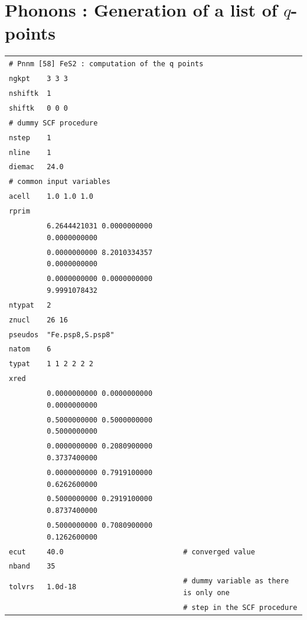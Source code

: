 \documentclass[11pt,a4paper]{article}
\begin{document}
\section{Phonons : Generation of a list of $q$-points}
\label{Abi9}
\begin{center}
\begin{tabular}{lll}
\multicolumn{3}{l}{\texttt{\# Pnnm [58] FeS2 : computation of the q points}}\\
\texttt{ngkpt} & \texttt{3 3 3} & \\
\texttt{nshiftk} & \texttt{1} & \\
\texttt{shiftk} & \texttt{0 0 0} & \\
\multicolumn{3}{l}{\texttt{\# dummy SCF procedure}}\\
\texttt{nstep} & \texttt{1} & \\
\texttt{nline} & \texttt{1} & \\
\texttt{diemac} &\texttt{24.0}\\
\multicolumn{3}{l}{\texttt{\# common input variables}}\\
\texttt{acell} & \texttt{1.0 1.0 1.0} & \\
\texttt{rprim}&&\\
&\texttt{6.2644421031    0.0000000000    0.0000000000}&\\
&\texttt{0.0000000000    8.2010334357    0.0000000000}&\\
&\texttt{0.0000000000    0.0000000000    9.9991078432}&\\
\texttt{ntypat} & \texttt{2} & \\
\texttt{znucl} & \texttt{26 16} & \\
\texttt{pseudos}&\texttt{"Fe.psp8,S.psp8"}&\\
\texttt{natom}&\texttt{6}&\\
\texttt{typat}&\texttt{1 1 2 2 2 2}&\\
\texttt{xred} &&\\
&\texttt{0.0000000000    0.0000000000    0.0000000000}&\\
&\texttt{0.5000000000    0.5000000000    0.5000000000}&\\
&\texttt{0.0000000000    0.2080900000    0.3737400000}&\\
&\texttt{0.0000000000    0.7919100000    0.6262600000}&\\
&\texttt{0.5000000000    0.2919100000    0.8737400000}&\\
&\texttt{0.5000000000    0.7080900000    0.1262600000}&\\
\texttt{ecut} &\texttt{40.0}&\texttt{\# converged value}\\
\texttt{nband} & \texttt{35} &\\
\texttt{tolvrs} &\texttt{1.0d-18}&\texttt{\# dummy variable as there is only one}\\
&&\texttt{\# step in the SCF procedure}
\end{tabular}
\end{center}
\newpage
\end{document}
